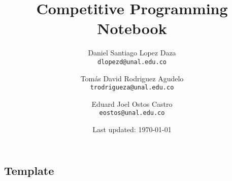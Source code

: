 \documentclass[landscape, 9pt]{article}
\title{Competitive Programming Notebook} %
\author{
 Daniel Santiago Lopez Daza\\
   \texttt{dlopezd@unal.edu.co}
  \and
  Tomás David Rodriguez Agudelo\\
  \texttt{trodrigueza@unal.edu.co}
  \and
  Eduard Joel Ostos Castro\\
    \texttt{eostos@unal.edu.co}
}
\date{Last updated: \today}
\begin{document}
\maketitle
\newpage
\tableofcontents
\newpage
\begin{multicols}{2}
\section{Template}





\end{multicols}
\end{document}
